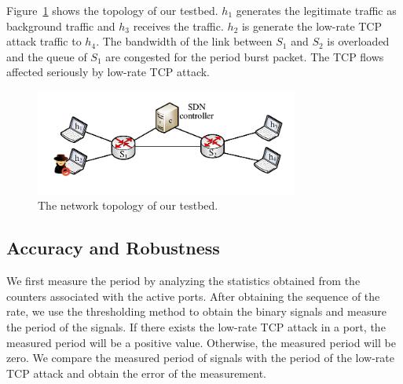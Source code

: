 \documentclass[conference]{IEEEtran}
\begin{document}
Figure~\ref{fig:topology} shows the topology of our testbed. $h_1$ generates the legitimate traffic as background traffic and $h_3$ receives the traffic. $h_2$ is generate the low-rate TCP attack traffic to $h_4$. The bandwidth of the link between $S_1$ and $S_2$ is overloaded and the queue of $S_1$ are congested for the period burst packet. The TCP flows affected seriously by low-rate TCP attack.

\begin{figure}
\vspace{-0.1in}
\centering
\includegraphics[width=3.4in]{Evaluation/topology.pdf}
\vspace{-0.1in}
\caption{\small{The network topology of our testbed.}}
\label{fig:topology}
\vspace{-0.2in}
\end{figure}

\subsection{Accuracy and Robustness}

We first measure the period by analyzing the statistics obtained from the counters associated with the active ports. After obtaining the sequence of the rate, we use the thresholding method to obtain the binary signals and measure the period of the signals. If there exists the low-rate TCP attack in a port, the measured period will be a positive value. Otherwise, the measured period will be zero. We compare the measured period of signals with the period of the low-rate TCP attack and obtain the error of the measurement.
\end{document}
